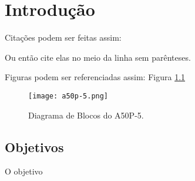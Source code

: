 
\chapter{Introdução}\label{cap:introducao}

Citações podem ser feitas assim: \cite{Verdoold2014}

Ou então cite elas no meio da linha 
sem parênteses.

Figuras podem ser referenciadas assim: Figura \ref{fig:a50p-5}

\begin{figure}[htb]
	\caption{\label{fig:a50p-5}Diagrama de Blocos do A50P-5.}
	\begin{center}
        \texttt{[image: a50p-5.png]}
	\end{center}
\end{figure}

\section{Objetivos} 

O objetivo 